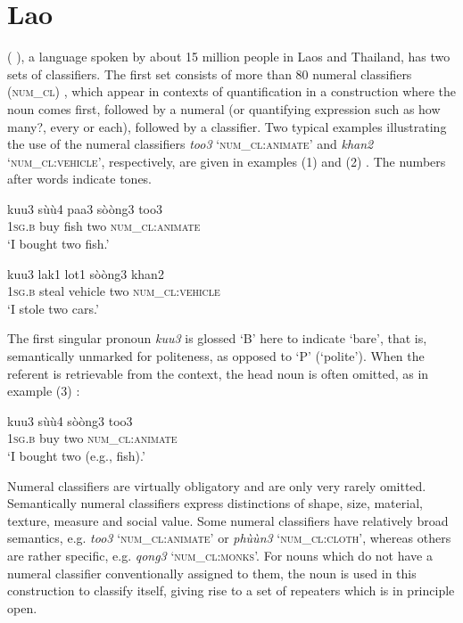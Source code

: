 \documentclass[output=paper]{langsci/langscibook}
\begin{document}
\section{Lao}

 (\citeauthor{Enfield2004} \citeyear{Enfield2004,Enfield2007}), a  language spoken by about 15 million people in Laos and Thailand, has two sets of classifiers. The first set consists of more than 80 numeral classifiers (\textsc{num\_cl}) \citep[xxi-xxiii]{Kerr1972}, which appear in contexts of quantification in a construction where the noun comes first, followed by a numeral (or quantifying expression such as how many?, every or each), followed by a classifier. Two typical examples illustrating the use of the numeral classifiers \textit{too3 }‘\textsc{num\_cl}:\textsc{animate}’ and \textit{khan2} ‘\textsc{num\_cl}:\textsc{vehicle}’, respectively, are given in examples (1) and (2) \citep[120,124]{Enfield2007}. The numbers after  words indicate tones.

\ea%
    \label{ex:fc:1}

    \gll   kuu3    sùù4    paa3  sòòng3  too3\\
	 1\textsc{sg.b}    buy    fish  two    \textsc{num\_cl}:\textsc{animate}\\
    \glt ‘I bought two fish.’
    \z
 

\ea%
    \label{ex:fc:2}

    \gll kuu3    lak1  lot1    sòòng3  khan2\\
	 1\textsc{sg.b}    steal  vehicle  two    \textsc{num\_cl}:\textsc{vehicle}\\
    \glt ‘I stole two cars.’
    \z


The first singular pronoun \textit{kuu3} is glossed ‘B’ here to indicate ‘bare’, that is, semantically unmarked for politeness, as opposed to ‘P’ (‘polite’). When the referent is retrievable from the context, the head noun is often omitted, as in example (3) \citep[139]{Enfield2007}:

\ea%
    \label{ex:fc:3}

    \gll   kuu3    sùù4    sòòng3  too3\\
	    1\textsc{sg.b}    buy    two    \textsc{num\_cl}:\textsc{animate}\\
    \glt ‘I bought two (e.g., fish).’
    \z
    

 Numeral classifiers are virtually obligatory and are only very rarely omitted. Semantically  numeral classifiers express distinctions of shape, size, material, texture, measure and social value. Some numeral classifiers have relatively broad semantics, e.g. \textit{too3} ‘\textsc{num\_cl}:\textsc{animate}’ or \textit{phùùn3} ‘\textsc{num\_cl}:\textsc{cloth}’, whereas others are rather specific, e.g. \textit{qong3} ‘\textsc{num\_cl}:\textsc{monks}’. For nouns which do not have a numeral classifier conventionally assigned to them, the noun is used in this construction to classify itself, giving rise to a set of repeaters which is in principle open. 
\end{document}
